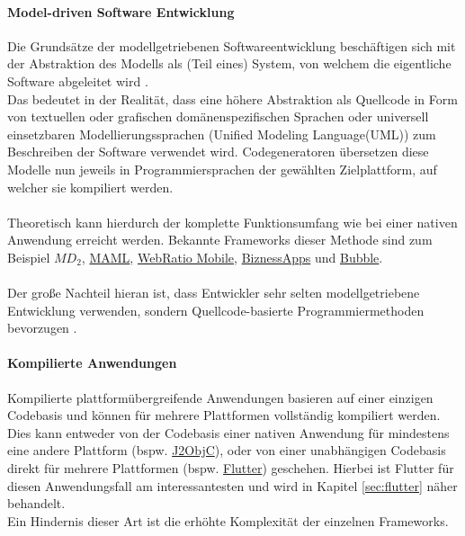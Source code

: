 \paragraph{Model-driven Software Entwicklung}
Die Grundsätze der modellgetriebenen Softwareentwicklung beschäftigen sich mit der Abstraktion des Modells als (Teil eines) System, von welchem die eigentliche Software abgeleitet wird \cite{stahl2006}.\\
Das bedeutet in der Realität, dass eine höhere Abstraktion als Quellcode in Form von textuellen oder grafischen domänenspezifischen Sprachen oder universell einsetzbaren Modellierungssprachen (Unified Modeling Language(UML)) zum Beschreiben der Software verwendet wird. 
Codegeneratoren übersetzen diese Modelle nun jeweils in Programmiersprachen der gewählten Zielplattform, auf welcher sie kompiliert werden.\\
\\
Theoretisch kann hierdurch der komplette Funktionsumfang wie bei einer nativen Anwendung erreicht werden.
Bekannte Frameworks dieser Methode sind zum Beispiel \href{https://www.wi.uni-muenster.de/sites/wi/files/public/department/pi/publications/heitkoetter/cross-platform-model-driven-development-of-mobile-applications-with-md2.pdf}{$M\!D_2$}, \href{https://www.sciencedirect.com/science/article/abs/pii/S1477842417301215}{MAML}, \href{https://www.webratio.com/site/content/en/home}{WebRatio Mobile}, \href{https://www.biznessapps.com/}{BiznessApps} und \href{https://bubble.io/}{Bubble}.\\
\\
Der große Nachteil hieran ist, dass Entwickler sehr selten modellgetriebene Entwicklung verwenden, sondern Quellcode-basierte Programmiermethoden bevorzugen \cite{bjorn-hansen2020}.
\paragraph{Kompilierte Anwendungen}
\label{compilierte_anwendungen}
Kompilierte plattformübergreifende Anwendungen basieren auf einer einzigen Codebasis und können für mehrere Plattformen vollständig kompiliert werden. 
Dies kann entweder von der Codebasis einer nativen Anwendung für mindestens eine andere Plattform (bspw. \href{https://developers.google.com/j2objc/}{J2ObjC}), oder von einer unabhängigen Codebasis direkt für mehrere Plattformen (bspw. \href{https://flutter.dev/}{Flutter}) geschehen.
Hierbei ist Flutter für diesen Anwendungsfall am interessantesten und wird in Kapitel \ref{sec:flutter} näher behandelt.\\
Ein Hindernis dieser Art ist die erhöhte Komplexität der einzelnen Frameworks.

